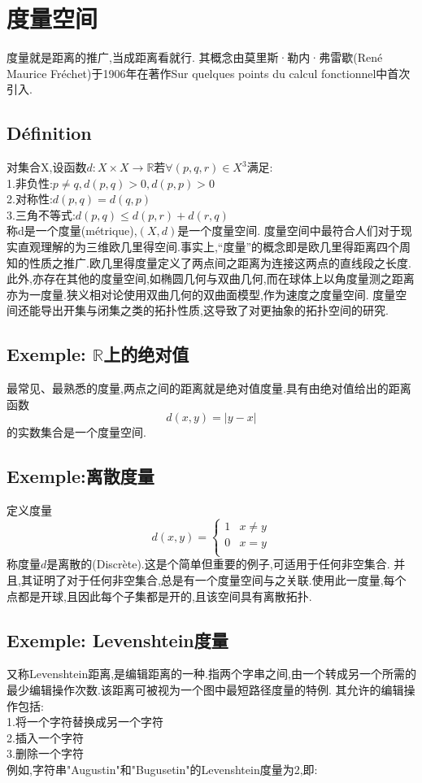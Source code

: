\documentclass[12pt, a4paper, oneside]{ctexbook}
\newcommand{\R }{\mathbb{R}}%
\begin{document}
\section{度量空间}
  度量就是距离的推广,当成距离看就行.
  其概念由莫里斯·勒内·弗雷歇(René Maurice Fréchet)于1906年在著作Sur quelques points du calcul fonctionnel中首次引入.
  \subsection{Définition}
  对集合X,设函数$d:X\times X\rightarrow \R$若$\forall(p,q,r)\in X^3$满足:\\
  1.非负性:$p\neq q,d(p,q)>0,d(p,p)>0$\\
  2.对称性:$d(p,q)=d(q,p)$\\
  3.三角不等式:$d(p,q)\leq d(p,r)+d(r,q)$\\
  称d是一个度量(métrique),$(X,d)$是一个度量空间.
  度量空间中最符合人们对于现实直观理解的为三维欧几里得空间.事实上,“度量”的概念即是欧几里得距离四个周知的性质之推广.欧几里得度量定义了两点间之距离为连接这两点的直线段之长度.
  此外,亦存在其他的度量空间,如椭圆几何与双曲几何,而在球体上以角度量测之距离亦为一度量.狭义相对论使用双曲几何的双曲面模型,作为速度之度量空间.
  度量空间还能导出开集与闭集之类的拓扑性质,这导致了对更抽象的拓扑空间的研究.
                 
  \subsection{Exemple: $\R$上的绝对值}
  最常见、最熟悉的度量,两点之间的距离就是绝对值度量.具有由绝对值给出的距离函数
  $$
  d(x,y) = \vert y - x \vert
  $$
  的实数集合是一个度量空间.

  \subsection{Exemple:离散度量}     \label{myref:lisanduliang}
  定义度量
  $$
  d(x,y)=
  \begin{cases}
    1 & x\neq y\\
    0 & x=y\\
  \end{cases}
  $$
  称度量$d$是离散的(Discrète).这是个简单但重要的例子,可适用于任何非空集合.
  并且,其证明了对于任何非空集合,总是有一个度量空间与之关联.使用此一度量,每个点都是开球,且因此每个子集都是开的,且该空间具有离散拓扑.
  
  \subsection{Exemple: Levenshtein度量}
  又称Levenshtein距离,是编辑距离的一种.指两个字串之间,由一个转成另一个所需的最少编辑操作次数.该距离可被视为一个图中最短路径度量的特例.
  其允许的编辑操作包括:\\
  1.将一个字符替换成另一个字符\\
  2.插入一个字符\\
  3.删除一个字符\\
  例如,字符串"Augustin"和"Bugusetin"的Levenshtein度量为2,即:\\
  
\end{document}
